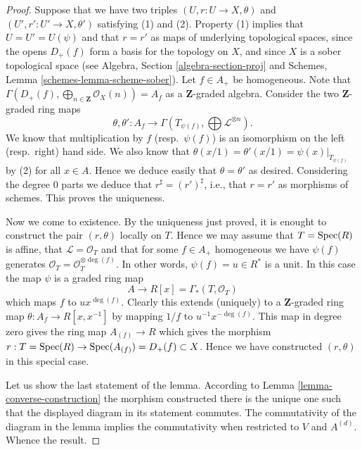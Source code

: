\begin{proof}
Suppose that we have two triples $(U, r : U \to X, \theta)$
and $(U', r' : U' \to X, \theta')$ satisfying (1) and (2).
Property (1) implies that $U = U' = U(\psi)$ and that
$r = r'$ as maps of underlying topological
spaces, since the opens $D_{+}(f)$ form a basis for the topology
on $X$, and since $X$ is a sober topological space (see
Algebra, Section \ref{algebra-section-proj}
and
Schemes, Lemma \ref{schemes-lemma-scheme-sober}).
Let $f \in A_{+}$ be homogeneous. Note that
$\Gamma(D_{+}(f), \bigoplus_{n \in \mathbf{Z}} \mathcal{O}_X(n)) = A_f$
as a $\mathbf{Z}$-graded algebra. Consider the two
$\mathbf{Z}$-graded ring maps
$$
\theta, \theta' :
A_f
\longrightarrow
\Gamma(T_{\psi(f)}, \bigoplus \mathcal{L}^{\otimes n}).
$$
We know that multiplication by $f$ (resp.\ $\psi(f)$)
is an isomorphism on the left (resp.\ right) hand side.
We also know that $\theta(x/1) = \theta'(x/1) = \psi(x)|_{T_{\psi(f)}}$
by (2) for all $x \in A$. Hence we deduce easily that $\theta = \theta'$
as desired. Considering the degree $0$ parts we deduce that
$r^\sharp = (r')^\sharp$, i.e., that $r = r'$ as morphisms of schemes.
This proves the uniqueness.

\medskip\noindent
Now we come to existence. By the uniqueness just proved, it is enought to
construct the pair $(r, \theta)$ locally on $T$. Hence we may assume
that $T = \mathop{\rm Spec}(R)$ is affine, that $\mathcal{L} = \mathcal{O}_T$
and that for some $f \in A_{+}$ homogeneous we have
$\psi(f)$ generates $\mathcal{O}_T = \mathcal{O}_T^{\otimes \deg(f)}$.
In other words, $\psi(f) = u \in R^*$ is a unit. In this case the map
$\psi$ is a graded ring map
$$
A \longrightarrow R[x] = \Gamma_*(T, \mathcal{O}_T)
$$
which maps $f$ to $ux^{\deg(f)}$. Clearly this extends (uniquely) to
a $\mathbf{Z}$-graded ring map $\theta : A_f \to R[x, x^{-1}]$ by
mapping $1/f$ to $u^{-1}x^{-\deg(f)}$. This map in degree zero gives
the ring map $A_{(f)} \to R$ which gives the morphism
$r : T = \mathop{\rm Spec}(R) \to \mathop{\rm Spec}(A_{(f)}) = D_{+}(f) \subset X$.
Hence we have constructed $(r, \theta)$ in this special case.

\medskip\noindent
Let us show the last statement of the lemma.
According to Lemma \ref{lemma-converse-construction}
the morphism constructed there is the unique one such that
the displayed diagram in its statement commutes.
The commutativity of the diagram in the lemma implies the
commutativity when restricted to $V$ and $A^{(d)}$.
Whence the result.
\end{proof}

